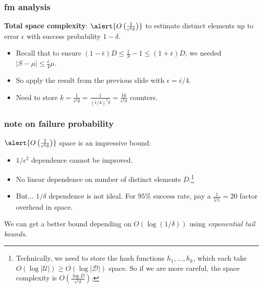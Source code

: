 \documentclass[handout,compress]{beamer}
\begin{document}
\begin{frame}[t]
	\frametitle{fm analysis}
	\textbf{Total space complexity}: $\alert{O\left(\frac{1}{\epsilon^2\delta}\right)}$ to estimate distinct elements up to error $\epsilon$ with success probability $1-\delta$.
	
	\begin{itemize}
		\item Recall that to ensure $(1-\bar{\epsilon}) D \leq \frac{1}{S} - 1 \leq (1+\bar{\epsilon}) D$, we needed  $|S - \mu| \leq \frac{\bar{\epsilon}}{4} \mu$. 
		\item So apply the result from the previous slide with $\epsilon = \bar{\epsilon}/4$. 
		\item Need to store $k = \frac{1}{\epsilon^2\delta} = \frac{1}{(\bar{\epsilon}/4)^2\delta} = \frac{16}{\epsilon^2\delta}$ counters.
	\end{itemize}
\end{frame}

\begin{frame}
	\frametitle{note on failure probability}
	$\alert{O\left(\frac{1}{\epsilon^2\delta}\right)}$ space is an impressive bound:
	\begin{itemize}
		\item $1/\epsilon^2$ dependence cannot be improved.
		\item No linear dependence on number of distinct elements $D$.\footnote{Technically, we need to store the hash functions $h_1, \ldots, h_k$, which each take $O(\log |\mathcal{U}|) \geq O(\log |\mathcal{D}|)$ space. So if we are more careful, the space complexity is $O\left(\frac{\log D}{\epsilon^2\delta}\right)$.}
		\item But... $1/\delta$ dependence is not ideal. For $95\%$ success rate, pay a $\frac{1}{5\%} = 20$ factor overhead in space. 
	\end{itemize}
We can get a better bound depending on $O(\log(1/\delta))$ using \emph{exponential tail bounds.}
\end{frame}
\end{document}
